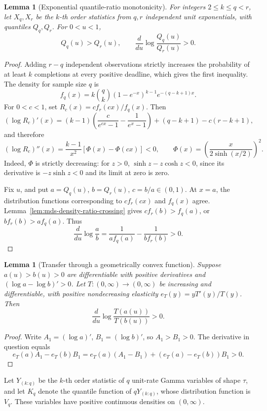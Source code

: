 \documentclass[11pt]{article}
\newtheorem{lemma}[theorem]{Lemma}
\theoremstyle{definition}
\theoremstyle{remark}
\newcommand{\1}{\mathbf 1}
\begin{document}
\begin{lemma}[Exponential quantile-ratio monotonicity]
\label{lem:mds-exponential-quantile-ratio}
For integers \(2\le k\le q<r\), let \(X_q,X_r\) be the \(k\)-th
order statistics from \(q,r\) independent unit exponentials, with
quantiles \(Q_q,Q_r\). For \(0<u<1\),
\[
 Q_q(u)>Q_r(u),\qquad
 \frac{d}{du}\log\frac{Q_q(u)}{Q_r(u)}>0.
\]
\end{lemma}
\begin{proof}
Adding \(r-q\) independent observations strictly increases the
probability of at least \(k\) completions at every positive deadline,
which gives the first inequality. The density for sample size \(q\) is
\[
 f_q(x)=k\binom qk(1-e^{-x})^{k-1}e^{-(q-k+1)x}.
\]
For \(0<c<1\), set \(R_c(x)=c f_r(cx)/f_q(x)\). Then
\[
 (\log R_c)'(x)
 =(k-1)\left(\frac{c}{e^{cx}-1}-\frac1{e^x-1}\right)
 +(q-k+1)-c(r-k+1),
\]
and therefore
\[
 (\log R_c)''(x)=\frac{k-1}{x^2}[\Phi(x)-\Phi(cx)]<0,
 \qquad
 \Phi(x)=\left(\frac{x}{2\sinh(x/2)}\right)^2.
\]
Indeed, \(\Phi\) is strictly decreasing: for \(z>0\),
\(\sinh z-z\cosh z<0\), since its derivative is
\(-z\sinh z<0\) and its limit at zero is zero.

Fix \(u\), and put \(a=Q_q(u)\), \(b=Q_r(u)\),
\(c=b/a\in(0,1)\). At \(x=a\), the distribution functions
corresponding to \(c f_r(cx)\) and \(f_q(x)\) agree.
Lemma~\ref{lem:mds-density-ratio-crossing} gives
\(c f_r(b)>f_q(a)\), or \(b f_r(b)>a f_q(a)\). Thus
\[
 \frac{d}{du}\log\frac{a}{b}
 =\frac1{a f_q(a)}-\frac1{b f_r(b)}>0.
\]
\end{proof}

\begin{lemma}[Transfer through a geometrically convex function]
\label{lem:mds-quantile-transfer}
Suppose \(a(u)>b(u)>0\) are differentiable with positive derivatives
and \((\log a-\log b)'>0\). Let \(T:(0,\infty)\to(0,\infty)\)
be increasing and differentiable, with positive nondecreasing
elasticity \(e_T(y)=yT'(y)/T(y)\). Then
\[
 \frac{d}{du}\log\frac{T(a(u))}{T(b(u))}>0.
\]
\end{lemma}
\begin{proof}
Write \(A_1=(\log a)'\), \(B_1=(\log b)'\), so
\(A_1>B_1>0\). The derivative in question equals
\[
 e_T(a)A_1-e_T(b)B_1
 =e_T(a)(A_1-B_1)+(e_T(a)-e_T(b))B_1>0.
\]
\end{proof}

Let \(Y_{(k:q)}\) be the \(k\)-th order statistic of \(q\) unit-rate
Gamma variables of shape \(\tau\), and let \(K_q\) denote the
quantile function of \(qY_{(k:q)}\), whose distribution function is
\(V_q\). These variables have positive continuous densities on
\((0,\infty)\).
\end{document}
